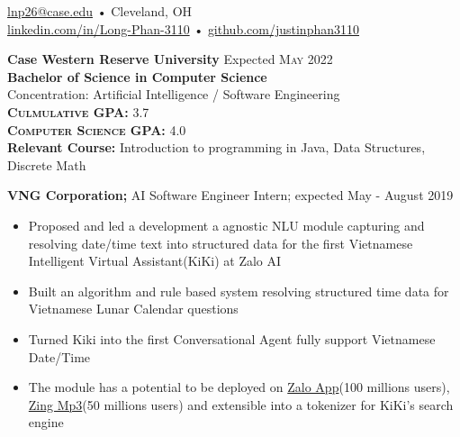 \documentclass[a4paper,11pt]{article}
\begin{document}
 
 
\begin{center} 
\href{mailto:lnp26@case.edu}{lnp26@case.edu} • Cleveland, OH \\
\href{https://linkedin.com/in/Long-Phan-3110/}{linkedin.com/in/Long-Phan-3110} • \href{http://github.com/justinphan3110}{github.com/justinphan3110}
\noindent\makebox[\linewidth]{\rule{\paperwidth}{2pt}}
\end{center}

\begin{flushleft}
	\textbf{Case Western Reserve University } \hspace{1cm} Expected \textsc{May} 2022 \\
	\textbf{Bachelor of Science in Computer Science} \\
	Concentration: Artificial Intelligence / Software Engineering \\
	\textbf{\textsc{Culmulative GPA:}} 3.7 \\
	\textbf{\textsc{Computer Science GPA:}} 4.0 \\ 
	\textbf{Relevant Course:} Introduction to programming in Java, Data Structures, Discrete Math \\
	\centering{\noindent\makebox{\rule{8cm}{1.5pt}}}
\end{flushleft}

\begin{flushleft}
	\textbf{VNG Corporation; } AI Software Engineer Intern; expected May - August 2019 \\
	\vspace{-\topsep}
	\begin{itemize}
		\setlength{\parskip}{0pt}
		\setlength{\itemsep}{0pt plus 1pt}
		\item Proposed and led a development a agnostic NLU module capturing and resolving date/time text into structured data for the first Vietnamese Intelligent Virtual Assistant(KiKi) at Zalo AI  
		\item Built an algorithm and rule based system resolving structured time data for Vietnamese Lunar Calendar questions  
		\item Turned Kiki into the first Conversational Agent fully support Vietnamese Date/Time 
		\item  The module has a potential to be deployed on  \href{https://oa.zalo.me/home}{Zalo App}(100 millions users),  \href{https://mp3.zing.vn/}{Zing Mp3}(50 millions users) and extensible into a tokenizer for KiKi's search engine
	\end{itemize}
\vspace{-\topsep}
\centering{\noindent\makebox{\rule{8cm}{1.5pt}}}
\end{flushleft} 
\end{document}
